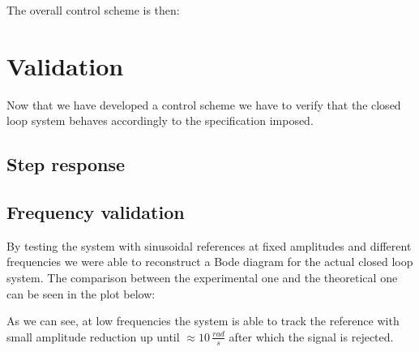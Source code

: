 
        The overall control scheme is then:


    \section{Validation}

        Now that we have developed a control scheme we have to verify that the closed loop system behaves accordingly to the specification imposed. 

        \subsection{Step response}

        \subsection{Frequency validation}

            By testing the system with sinusoidal references at fixed amplitudes and different frequencies we were able to reconstruct a Bode diagram for the actual closed loop system. The comparison between the experimental one and the theoretical one can be seen in the plot below:


            As we can see, at low frequencies the system is able to track the reference with small amplitude reduction up until $\approx 10 \, \frac{rad}{s}$ after which the signal is rejected.